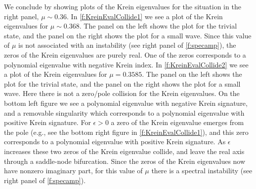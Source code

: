\documentclass[review,onefignum,onetabnum]{siamart171218}
\begin{document}
We conclude by showing plots of the Krein eigenvalues for the situation in the right panel, $\mu\sim0.36$. In \cref{f:KreinEvalCollide1} we see
a plot of the Krein eigenvalues for $\mu\sim0.368$. The panel on the left
shows the plot for the trivial state, and the panel on the right shows the
plot for a small wave. Since this value of $\mu$ is not associated with an
instability (see right panel of \cref{f:specamp}), the zeros of the Krein
eigenvalues are purely real. One of the zeros corresponds to a polynomial eigenvalue with negative Krein index. In
\cref{f:KreinEvalCollide2} we see a plot of the Krein eigenvalues for
$\mu=0.3585$. The panel on the left shows the plot for the trivial state, and
the panel on the right shows the plot for a small wave.
Here there is not a
zero/pole collision for the Krein eigenvalues. On the bottom left figure we see a polynomial eigenvalue with negative Krein signature, and a removable singularity which corresponds to a polynomial eigenvalue with positive Krein signature. For $\epsilon>0$ a zero of the Krein eigenvalue emerges from the pole (e.g., see the bottom right figure in \cref{f:KreinEvalCollide1}), and this zero corresponds to a polynomial eigenvalue with positive Krein signature. As $\epsilon$ increases these two zeros of the Krein eigenvalue collide, and leave the real axis through a saddle-node bifurcation. Since the
zeros of the Krein eigenvalues now have nonzero imaginary part, for this value of $\mu$ there is a spectral instability (see right panel of \cref{f:specamp}).

\end{document}
